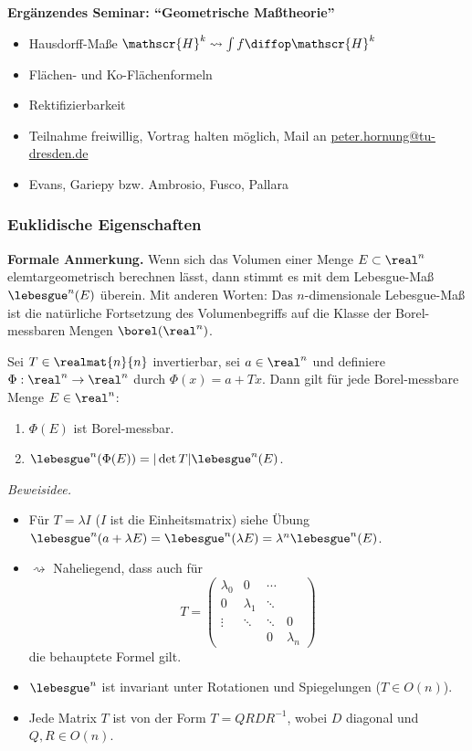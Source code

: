 \textbf{Ergänzendes Seminar: ``Geometrische Maßtheorie''}
\begin{itemize}
 \item Hausdorff-Maße $\mathscr{H}^k \rightsquigarrow \int f \diffop \mathscr{H}^k$
 \item Flächen- und Ko-Flächenformeln
 \item Rektifizierbarkeit
 \item Teilnahme freiwillig, Vortrag halten möglich, Mail an \href{mailto:peter.hornung@tu-dresden.de}{peter.hornung@tu-dresden.de}
 \item Evans, Gariepy bzw. Ambrosio, Fusco, Pallara
\end{itemize}

\subsubsection{Euklidische Eigenschaften}
\textbf{Formale Anmerkung.} Wenn sich das Volumen einer Menge $E \subset \real^n$ elemtargeometrisch berechnen lässt, dann stimmt es mit dem Lebesgue-Maß $\lebesgue^n(E)$ überein. Mit anderen Worten: Das $n$-dimensionale Lebesgue-Maß ist die natürliche Fortsetzung des Volumenbegriffs auf die Klasse der Borel-messbaren Mengen $\borel(\real^n)$.

\begin{thm}
 Sei $T \in \realmat{n}{n}$ invertierbar, sei $a \in \real^n$ und definiere $\Phi:\real^n \to \real^n$ durch $\Phi(x) = a + Tx$. Dann gilt für jede Borel-messbare Menge $E \in \real^n$:
 \begin{enumerate}
  \item $\Phi(E)$ ist Borel-messbar.
  \item $\lebesgue^n( \Phi(E) ) = | \det T | \lebesgue^n (E)$.
 \end{enumerate}
\end{thm}

\emph{Beweisidee.} 
\begin{itemize}
 \item Für $T = \lambda I$ ($I$ ist die Einheitsmatrix) siehe Übung $\lebesgue^n (a + \lambda E) = \lebesgue^n ( \lambda E ) = \lambda^n \lebesgue^n (E)$. 
 \item $\rightsquigarrow$ Naheliegend, dass auch für 
\[ T = \begin{pmatrix} 
        \lambda_0 & 0 & \cdots & \\
        0 & \lambda_1 & \ddots & \\
        \vdots  & \ddots & \ddots & 0 \\
          &  & 0 & \lambda_n
       \end{pmatrix} \]
 die behauptete Formel gilt.
 \item $\lebesgue^n$ ist invariant unter Rotationen und Spiegelungen ($T \in O(n)$).
 \item Jede Matrix $T$ ist von der Form $T = QRDR^{-1}$, wobei $D$ diagonal und $Q,R \in O(n)$.
\end{itemize}

